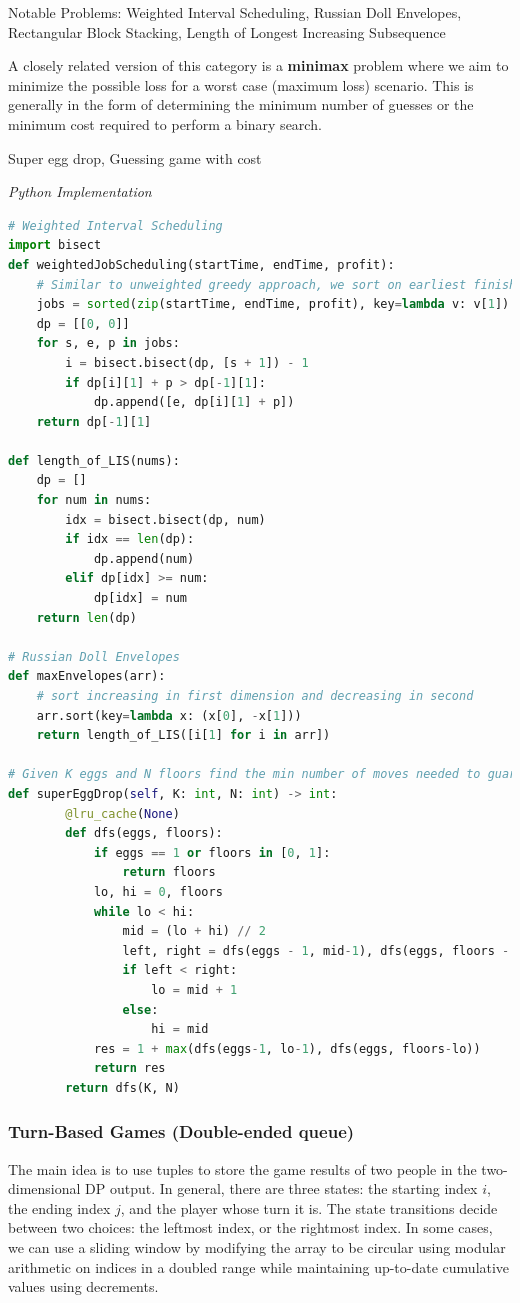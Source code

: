 \documentclass{article}
\begin{document}
Notable Problems: Weighted Interval Scheduling, Russian Doll Envelopes, Rectangular Block Stacking, Length of Longest Increasing Subsequence

A closely related version of this category is a \textbf{minimax} problem where we aim to minimize the possible loss for a worst case (maximum loss) scenario. This is generally in the form of determining the minimum number of guesses or the minimum cost required to perform a binary search.

Super egg drop, Guessing game with cost %

\vspace{8pt} \emph{Python Implementation}
\begin{lstlisting}[language=Python]
# Weighted Interval Scheduling
import bisect
def weightedJobScheduling(startTime, endTime, profit):
    # Similar to unweighted greedy approach, we sort on earliest finish time
    jobs = sorted(zip(startTime, endTime, profit), key=lambda v: v[1])
    dp = [[0, 0]]
    for s, e, p in jobs:
        i = bisect.bisect(dp, [s + 1]) - 1
        if dp[i][1] + p > dp[-1][1]:
            dp.append([e, dp[i][1] + p])
    return dp[-1][1]

def length_of_LIS(nums):
    dp = []
    for num in nums:
        idx = bisect.bisect(dp, num)
        if idx == len(dp):
            dp.append(num)
        elif dp[idx] >= num:
            dp[idx] = num
    return len(dp)

# Russian Doll Envelopes
def maxEnvelopes(arr):
    # sort increasing in first dimension and decreasing in second
    arr.sort(key=lambda x: (x[0], -x[1]))
    return length_of_LIS([i[1] for i in arr])
    
# Given K eggs and N floors find the min number of moves needed to guarantee you find the lowest floor needed to break the egg
def superEggDrop(self, K: int, N: int) -> int:
        @lru_cache(None)
        def dfs(eggs, floors):
            if eggs == 1 or floors in [0, 1]: 
                return floors
            lo, hi = 0, floors
            while lo < hi:
                mid = (lo + hi) // 2
                left, right = dfs(eggs - 1, mid-1), dfs(eggs, floors - mid)
                if left < right:
                    lo = mid + 1
                else:
                    hi = mid
            res = 1 + max(dfs(eggs-1, lo-1), dfs(eggs, floors-lo))
            return res
        return dfs(K, N)
\end{lstlisting}

\subsubsection*{Turn-Based Games (Double-ended queue)}
The main idea is to use tuples to store the game results of two people in the two-dimensional DP output. In general, there are three states: the starting index $i$, the ending index $j$, and the player whose turn it is. The state transitions decide between two choices: the leftmost index, or the rightmost index. In some cases, we can use a sliding window by modifying the array to be circular using modular arithmetic on indices in a doubled range while maintaining up-to-date cumulative values using decrements.
\end{document}
